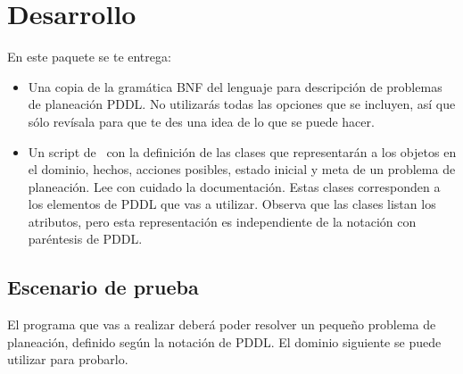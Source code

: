 \section{Desarrollo}

En este paquete se te entrega:
\begin{itemize}
 \item Una copia de la gramática BNF del lenguaje para descripción de problemas de planeación PDDL.
       No utilizarás todas las opciones que se incluyen, así que sólo revísala para que te des una 
       idea de lo que se puede hacer.
 \item Un script de \Python\ con la definición de las clases que representarán a los objetos en
       el dominio, hechos, acciones posibles, estado inicial y meta de un problema de planeación.
       Lee con cuidado la documentación.  Estas clases corresponden a los elementos de PDDL que
       vas a utilizar.  Observa que las clases listan los atributos, pero esta representación es
       independiente de la notación con paréntesis de PDDL.
\end{itemize}


\subsection{Escenario de prueba}

El programa que vas a realizar deberá poder resolver un pequeño problema de planeación, definido según la notación de PDDL.  El dominio siguiente se puede utilizar para probarlo.

